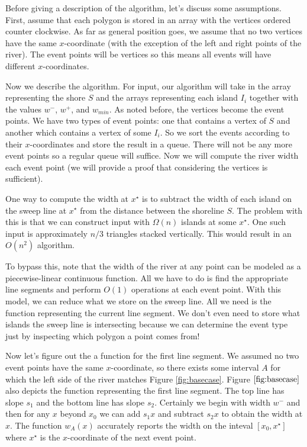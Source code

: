 \documentclass[11pt]{article}
\begin{document}
Before giving a description of the algorithm, let's discuss some assumptions.
First, assume that each polygon is stored in an array with the vertices ordered counter clockwise.
As far as general position goes, we assume that no two vertices have the same $x$-coordinate (with the exception of the left and right points of the river).
The event points will be vertices so this means all events will have different $x$-coordinates.

Now we describe the algorithm.
For input, our algorithm will take in the array representing the shore $S$ and the arrays representing each island $I_i$ together with the values $w^-$, $w^+$, and $w_{min}$.
As noted before, the vertices become the event points.
We have two types of event points: one that contains a vertex of $S$ and another which contains a vertex of some $I_i$.
So we sort the events according to their $x$-coordinates and store the result in a queue.
There will not be any more event points so a regular queue will suffice.
Now we will compute the river width each event point (we will provide a proof that considering the vertices is sufficient).

One way to compute the width at $x^\star$ is to subtract the width of each island on the sweep line at $x^\star$ from the distance between the shoreline $S$.
The problem with this is that we can construct input with $\Omega (n)$ islands at some $x^\star$.
One such input is approximately $n/3$ triangles stacked vertically.
This would result in an $O(n^2)$ algorithm.

To bypass this, note that the width of the river at any point can be modeled as a piecewise-linear continuous function.
All we have to do is find the appropriate line segments and perform $O(1)$ operations at each event point.
With this model, we can reduce what we store on the sweep line.
All we need is the function representing the current line segment.
We don't even need to store what islands the sweep line is intersecting because we can determine the event type just by inspecting which polygon a point comes from!

Now let's figure out the a function for the first line segment.
We assumed no two event points have the same $x$-coordinate, so there exists some interval $A$ for which the left side of the river matches Figure \ref{fig:basecase}.
Figure $\ref{fig:basecase}$ also depicts the function representing the first line segment.
The top line has slope $s_1$ and the bottom line has slope $s_2$.
Certainly we begin with width $w^-$ and then for any $x$ beyond $x_0$ we can add $s_1 x$ and subtract $s_2 x$ to obtain the width at $x$.
The function $w_A (x)$ accurately reports the width on the inteval $[x_0, x^\star]$ where $x^\star$ is the $x$-coordinate of the next event point.
\end{document}
